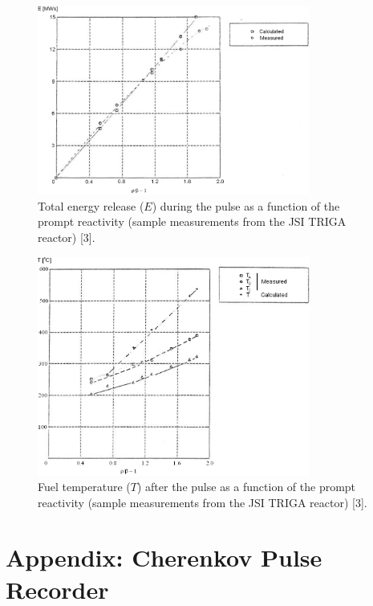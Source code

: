 \documentclass[a4paper,12pt]{article}
\begin{document}
\begin{figure}[ht!]
	\centering
	\includegraphics[width=0.8\textwidth]{fig2.png}
	\caption{Total energy release ($E$) during the pulse as a function of the prompt reactivity (sample measurements from the JSI TRIGA reactor) [3].}
	\label{Fig:f2}
\end{figure}

\newpage

\begin{figure}[ht!]
	\centering
	\includegraphics[width=0.8\textwidth]{fig3.png}
	\caption{Fuel temperature ($T$) after the pulse as a function of the prompt reactivity (sample measurements from the JSI TRIGA reactor) [3].}
	\label{Fig:f3}
\end{figure}



\section{Appendix: Cherenkov Pulse Recorder}
\end{document}
